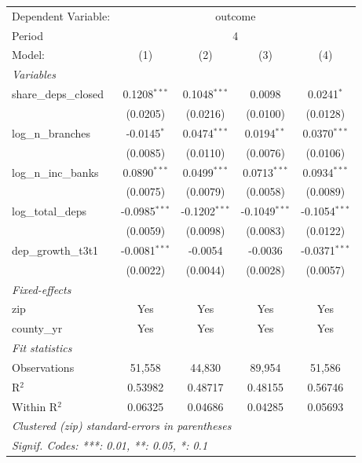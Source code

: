 \begingroup
\centering
\begin{tabular}{lcccc}
   \tabularnewline \midrule \midrule
   Dependent Variable: & \multicolumn{4}{c}{outcome}\\
   Period & \multicolumn{4}{c}{4} \\ 
   Model:                & (1)             & (2)             & (3)             & (4)\\  
   \midrule
   \emph{Variables}\\
   share\_deps\_closed   & 0.1208$^{***}$  & 0.1048$^{***}$  & 0.0098          & 0.0241$^{*}$\\   
                         & (0.0205)        & (0.0216)        & (0.0100)        & (0.0128)\\   
   log\_n\_branches      & -0.0145$^{*}$   & 0.0474$^{***}$  & 0.0194$^{**}$   & 0.0370$^{***}$\\   
                         & (0.0085)        & (0.0110)        & (0.0076)        & (0.0106)\\   
   log\_n\_inc\_banks    & 0.0890$^{***}$  & 0.0499$^{***}$  & 0.0713$^{***}$  & 0.0934$^{***}$\\   
                         & (0.0075)        & (0.0079)        & (0.0058)        & (0.0089)\\   
   log\_total\_deps      & -0.0985$^{***}$ & -0.1202$^{***}$ & -0.1049$^{***}$ & -0.1054$^{***}$\\   
                         & (0.0059)        & (0.0098)        & (0.0083)        & (0.0122)\\   
   dep\_growth\_t3t1     & -0.0081$^{***}$ & -0.0054         & -0.0036         & -0.0371$^{***}$\\   
                         & (0.0022)        & (0.0044)        & (0.0028)        & (0.0057)\\   
   \midrule
   \emph{Fixed-effects}\\
   zip                   & Yes             & Yes             & Yes             & Yes\\  
   county\_yr            & Yes             & Yes             & Yes             & Yes\\  
   \midrule
   \emph{Fit statistics}\\
   Observations          & 51,558          & 44,830          & 89,954          & 51,586\\  
   R$^2$                 & 0.53982         & 0.48717         & 0.48155         & 0.56746\\  
   Within R$^2$          & 0.06325         & 0.04686         & 0.04285         & 0.05693\\  
   \midrule \midrule
   \multicolumn{5}{l}{\emph{Clustered (zip) standard-errors in parentheses}}\\
   \multicolumn{5}{l}{\emph{Signif. Codes: ***: 0.01, **: 0.05, *: 0.1}}\\
\end{tabular}
\par\endgroup
